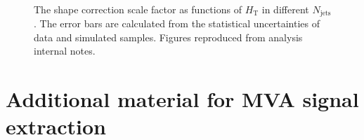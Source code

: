 \begin{figure}
   \\ 
  \caption{The \ttbar shape correction scale factor as functions of $H_{\text{T}}$ in different $N_{\text{jets}}$. 
  The error bars are calculated from the statistical uncertainties of data and simulated samples.
  Figures reproduced from analysis internal notes.}
  \label{fig:ttbarReweighting_parametrisations}
\end{figure}







\section{Additional material for MVA signal extraction}
\label{sec:appendix:mva}

